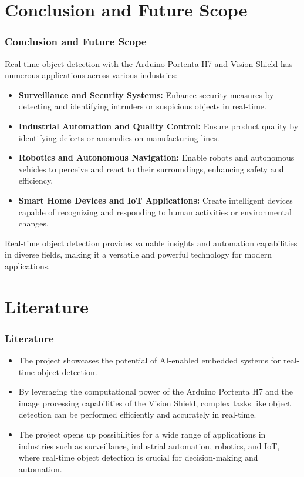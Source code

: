 \documentclass[10pt, a4paper]{beamer}
\begin{document}
	
	\section{Conclusion and Future Scope}
	\begin{frame}
		\frametitle{Conclusion and Future Scope}
		
		Real-time object detection with the Arduino Portenta H7 and Vision Shield has numerous applications across various industries:
		
		\begin{itemize}
			\item \textbf{Surveillance and Security Systems:} Enhance security measures by detecting and identifying intruders or suspicious objects in real-time.
			\item \textbf{Industrial Automation and Quality Control:} Ensure product quality by identifying defects or anomalies on manufacturing lines.
			\item \textbf{Robotics and Autonomous Navigation:} Enable robots and autonomous vehicles to perceive and react to their surroundings, enhancing safety and efficiency.
			\item \textbf{Smart Home Devices and IoT Applications:} Create intelligent devices capable of recognizing and responding to human activities or environmental changes.
		\end{itemize}
		
		Real-time object detection provides valuable insights and automation capabilities in diverse fields, making it a versatile and powerful technology for modern applications.
		
	\end{frame}
	
	
	\section{Literature}
	\begin{frame}
		\frametitle{Literature}
		
		
		\begin{itemize}
			\item The project showcases the potential of AI-enabled embedded systems for real-time object detection.
			\item By leveraging the computational power of the Arduino Portenta H7 and the image processing capabilities of the Vision Shield, complex tasks like object detection can be performed efficiently and accurately in real-time.
			\item The project opens up possibilities for a wide range of applications in industries such as surveillance, industrial automation, robotics, and IoT, where real-time object detection is crucial for decision-making and automation.
		\end{itemize}
		
	\end{frame}
	

	

	
	
\end{document}
